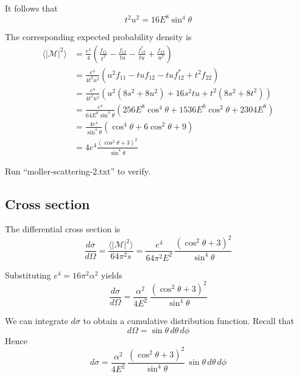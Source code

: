 \documentclass[12pt]{article}
\begin{document}
\noindent
It follows that
\begin{equation*}
t^2u^2=16E^8\sin^4\theta
\end{equation*}

\noindent
The corresponding expected probability density is
\begin{align*}
\langle|\mathcal{M}|^2\rangle
&=\frac{e^4}{4}
\left(
\frac{f_{11}}{t^2}-\frac{f_{12}}{tu}-\frac{f_{12}^*}{tu}+\frac{f_{22}}{u^2}
\right)
\\
&=\frac{e^4}{4t^2u^2}
\left(
u^2f_{11}-tuf_{12}-tuf_{12}^*+t^2f_{22}
\right)
\\
&=\frac{e^4}{4t^2u^2}
\left(
u^2\left(8s^2+8u^2\right)+16s^2tu+t^2\left(8s^2+8t^2\right)
\right)
\\
&=\frac{e^4}{64E^8\sin^4\theta}
\left(256 E^8\cos^4\theta+1536 E^8\cos^2\theta+2304 E^8\right)
\\
&=\frac{4e^4}{\sin^4\theta}
\left(\cos^4\theta+6\cos^2\theta+9\right)
\\
&=4e^4\frac{\left(\cos^2\theta+3\right)^2}{\sin^4\theta}
\end{align*}

\noindent
Run ``moller-scattering-2.txt'' to verify.

\subsection*{Cross section}
The differential cross section is
\begin{equation*}
\frac{d\sigma}{d\Omega}
=\frac{\langle|\mathcal{M}|^2\rangle}{64\pi^2s}
=\frac{e^4}{64\pi^2E^2}\,\frac{\left(\cos^2\theta+3\right)^2}{\sin^4\theta}
\end{equation*}

\noindent
Substituting $e^4=16\pi^2\alpha^2$ yields
\begin{equation*}
\frac{d\sigma}{d\Omega}=\frac{\alpha^2}{4E^2}\,\frac{\left(\cos^2\theta+3\right)^2}{\sin^4\theta}
\end{equation*}

\noindent
We can integrate $d\sigma$ to obtain a cumulative distribution function.
Recall that
\begin{equation*}
d\Omega=\sin\theta\,d\theta\,d\phi
\end{equation*}
Hence
\begin{equation*}
d\sigma=\frac{\alpha^2}{4E^2}\,\frac{\left(\cos^2\theta+3\right)^2}{\sin^4\theta}\,\sin\theta\,d\theta\,d\phi
\end{equation*}
\end{document}
